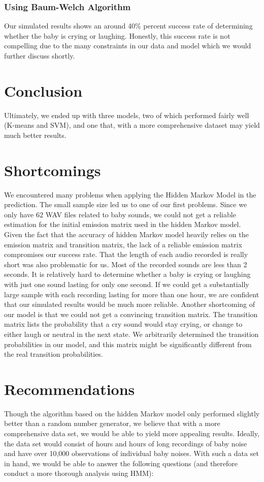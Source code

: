 \documentclass[paper=a4, fontsize=11pt]{scrartcl}
\numberwithin{equation}{section}
\numberwithin{figure}{section}
\numberwithin{table}{section}
\begin{document}
\subsubsection{Using Baum-Welch Algorithm}

Our simulated results shows an around 40\% percent success rate of determining whether the baby is crying or laughing. Honestly, this success rate is not compelling due to the many constraints in our data and model which we would further discuss shortly.

\section{Conclusion}
Ultimately, we ended up with three models, two of which performed fairly well (K-means and SVM), and one that, with a more comprehensive dataset may yield much better results. 

\section{Shortcomings}
We encountered many problems when applying the Hidden Markov Model in the prediction. The small sample size led us to one of our first problems. Since we only have 62 WAV files related to baby sounds, we could not get a reliable estimation for the initial emission matrix used in the hidden Markov model. Given the fact that the accuracy of hidden Markov model heavily relies on the emission matrix and transition matrix, the lack of a reliable emission matrix compromises our success rate. That the length of each audio recorded is really short was also problematic for us. Most of the recorded sounds are less than 2 seconds. It is relatively hard to determine whether a baby is crying or laughing with just one sound lasting for only one second. If we could get a substantially large sample with each recording lasting for more than one hour, we are confident that our simulated results would be much more reliable. Another shortcoming of our model is that we could not get a convincing transition matrix. The transition matrix lists the probability that a cry sound would stay crying, or change to either laugh or neutral in the next state. We arbitrarily determined the transition probabilities in our model, and this matrix might be significantly different from the real transition probabilities.

\section{Recommendations}
Though the algorithm based on the hidden Markov model only performed slightly better than a random number generator, we believe that with a more comprehensive data set, we would be able to yield more appealing results. Ideally, the data set would consist of hours and hours of long recordings of baby noise and have over 10,000 observations of individual baby noises. With such a data set in hand, we would be able to answer the following questions (and therefore conduct a more thorough analysis using HMM):
\end{document}
